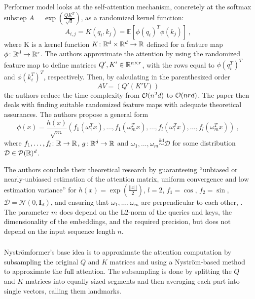 Performer model \citep{performer} looks at the self-attention mechanism, concretely at the softmax substep $A=\exp(\frac{QK^T}{\sqrt{d}})$, as a randomized kernel function: 
\begin{equation}
    A_{i,j}=K(q_i,k_j)=\mathbb{E}[\phi(q_i)^T\phi(k_j)]\ ,
\end{equation}
where K is a kernel function $K\colon\mathbb{R}^d\times\mathbb{R}^d\rightarrow\mathbb{R}$ defined for a feature map $\phi\colon\mathbb{R}^d\rightarrow\mathbb{R}^r$.
The authors approximate the attention by using the randomized feature map to define matrices $Q', K'\in\mathbb{R}^{n\times r}$, with the rows equal to $\phi(q_i^T)^T$ and $\phi(k_i^T)^T$, respectively.
Then, by calculating in the parenthesized order
\begin{equation}
        AV = (Q'(K'V))
\end{equation}
the authors reduce the time complexity from $\mathcal{O}(n^2d)$ to $\mathcal{O}(nrd)$.
The paper then deals with finding suitable randomized feature maps with adequate theoretical assurances. 
The authors propose a general form
\begin{equation}
        \phi(x)=\frac{h(x)}{\sqrt{m}}(f_1(\omega_1^Tx),\dots,f_1(\omega_m^Tx),
        \dots,f_l(\omega_1^Tx),\dots,f_l(\omega_m^Tx))\ ,
\end{equation}
where $f_1,\dots,f_l\colon\mathbb{R}\rightarrow\mathbb{R}$, $g\colon\mathbb{R}^d\rightarrow\mathbb{R}$ and $\omega_1,\dots,\omega_m\overset{\text{iid}}{\sim}\mathcal{D}$ for some distribution $\mathcal{D}\in\mathcal{P} ( \mathbb{R} )^d$.

The authors conclude their theoretical research by guaranteeing ``unbiased or nearly-unbiased estimation of the attention matrix, uniform convergence and low estimation variance'' for $h(x)=\exp(\frac{||x||}{2})$, $l=2$, $f_1=\cos$, $f_2=\sin$, $\mathcal{D}=\mathcal{N}(0,\textbf{I}_d)$, and ensuring that $\omega_1,\dots,\omega_m$ are perpendicular to each other, \citep[Theorem 4]{performer}.
The parameter $m$ does depend on the L2-norm of the queries and keys, the dimensionality of the embeddings, and the required precision, but does not depend on the input sequence length $n$.

\subsubsection{\nystr{}}

Nystr\"omformer's \citep{nystrom} base idea is to approximate the attention computation by subsampling the original $Q$ and $K$ matrices and using a Nystr\"om-based method \citep{nystrom-matrix-approx} to approximate the full attention. 
The subsampling is done by splitting the $Q$ and $K$ matrices into equally sized segments and then averaging each part into single vectors, calling them landmarks.

